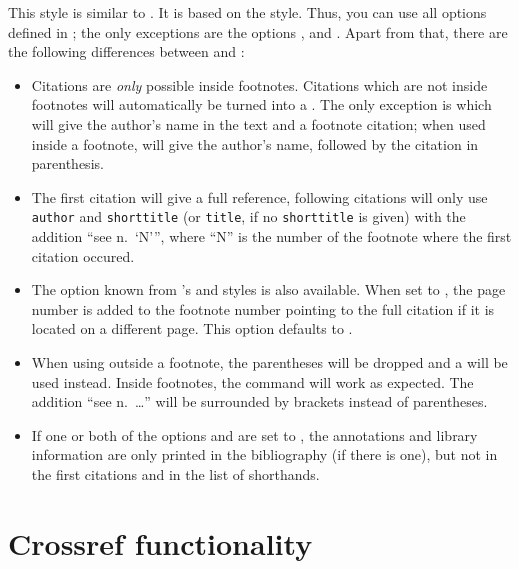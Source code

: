 \documentclass[english]{scrartcl}
\begin{document}
This style is similar to . It is based on the 
 style. Thus, you can use all options defined in 
; the only exceptions are the options  ,
 and .
Apart from that, there are the following differences between  and
:
\medskip 
\begin{itemize}
	\item Citations are \emph{only} possible inside footnotes. Citations
	      which are not inside footnotes will automatically be turned into 
	      a . The only exception is  which will
	      give the author's name in the text and a footnote citation; when used inside
	      a footnote,  will give the author's name, followed by the
	      citation in parenthesis.
	\item The first citation will give a full reference, following citations
	      will only use \texttt{author} and \texttt{shorttitle} (or 
	      \texttt{title}, if no \texttt{shorttitle} is given) with the
	      addition \enquote{see n.~\enquote{N}}, where \enquote{N} is
	      the number of the footnote where the first citation occured.
	\item The option  known from \bl's  and 
	       styles is also available. When set to ,
	      the page number is added to the footnote number pointing to the full 
	      citation if it is located on a different page. This option defaults to 
	      .
	\item When using  outside a footnote, the parentheses 
	      will be dropped and a  will be used instead. Inside
	      footnotes, the  command will work as expected. The
	      addition \enquote{see n.~\ldots} will be surrounded by brackets
	      instead of parentheses.
	\item If one or both of the options  and  
	      are set to , the annotations and library information
	      are only printed in the bibliography (if there is one), but not in the 
	      first citations and in the list of shorthands.
\end{itemize}

\section{Crossref functionality}
\label{xreffunctionality}
\end{document}
